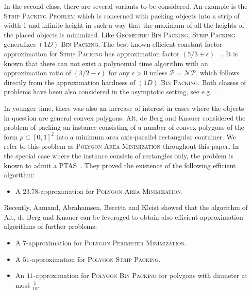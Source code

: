 \documentclass[a4paper,UKenglish,cleveref, autoref, thm-restate]{lipics_v2021}
\begin{document}
In the second class, there are several variants to be considered. An example is the \textsc{Strip Packing Problem} which is concerned with packing objects into a strip of width $1$ and infinite height in such a way that the maximum of all the heights of the placed objects is minimized. Like \textsc{Geometric Bin Packing}, \textsc{Strip Packing} generalizes $(1D)$ \textsc{Bin Packing}. The best known efficient constant factor approximation for \textsc{Strip Packing} has approximation factor $(5/3+ \epsilon)$~~\cite{harren}. It is known that there can not exist a polynomial time algorithm with an approximation ratio of $(3/2-\epsilon)$ for any $\epsilon > 0$ unless $\mathcal{P} = \mathcal{NP}$, which follows directly from the approximation hardness of $(1D)$ \textsc{Bin Packing}. Both classes of problems have been also considered in the asymptotic setting, see e.g.~\cite{hoberg, khanbansal,JANSEN_strip}.

In younger time, there was also an increase of interest in cases where the objects in question are general convex polygons.
%
Alt, de Berg and Knauer \cite{alt_17,alt_17_corrigendum} considered the problem of packing an instance consisting of a number of convex polygons of the form $p \subset [0,1]^2$ into a minimum area axis-parallel rectangular container. We refer to this problem as \textsc{Polygon Area Minimization} throughout this paper. In the special case where the instance consists of rectangles only, the problem is known to admit a PTAS~\cite{bansal_06}. They proved the existence of the following efficient algorithm:
\begin{itemize}
    \item A $23.78$-approximation for \textsc{Polygon Area Minimization}.
\end{itemize}
Recently, Aamand, Abrahamsen, Beretta and Kleist \cite{aamand_23} showed that the algorithm of Alt, de Berg and Knauer can be leveraged to obtain also efficient approximation algorithms of further problems:
\begin{itemize}
    \item A $7$-approximation for \textsc{Polygon Perimeter Minimization}.
    \item A $51$-approximation for \textsc{Polygon Strip Packing}.
    \item An $11$-approximation for \textsc{Polygon Bin Packing} for polygons with diameter at most $\frac{1}{10}$.
\end{itemize}
\end{document}
